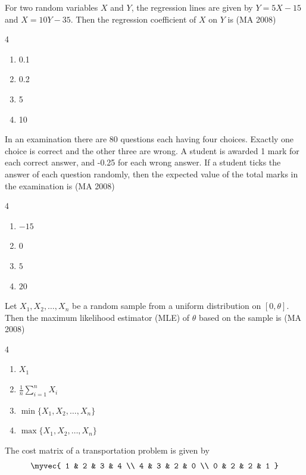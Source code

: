 \item
For two random variables $X$ and $Y$, the regression lines are given by $Y = 5X - 15$ and $X = 10Y - 35$. Then the regression coefficient of $X$ on $Y$ is
\hfill (MA 2008)
\begin{multicols}{4}
\begin{enumerate}
    \item 0.1
    \item 0.2
    \item 5
    \item 10
\end{enumerate}
\end{multicols}

\item
In an examination there are 80 questions each having four choices. Exactly one choice is correct and the other three are wrong. A student is awarded 1 mark for each correct answer, and -0.25 for each wrong answer. If a student ticks the answer of each question randomly, then the expected value of the total marks in the examination is
\hfill (MA 2008)
\begin{multicols}{4}
\begin{enumerate}
    \item $-15$
    \item $0$
    \item $5$
    \item $20$
\end{enumerate}
\end{multicols}

\item
Let $X_1, X_2, \ldots, X_n$ be a random sample from a uniform distribution on $[0,\theta]$. Then the maximum likelihood estimator (MLE) of $\theta$ based on the sample is
\hfill (MA 2008)
\begin{multicols}{4}
\begin{enumerate}
    \item $X_1$
    \item $\frac{1}{n} \sum_{i=1}^n X_i$
    \item $\min\{X_1, X_2, \ldots, X_n\}$
    \item $\max\{X_1, X_2, \ldots, X_n\}$
\end{enumerate}
\end{multicols}

\item
The cost matrix of a transportation problem is given by
\begin{align}
    \myvec{
1 & 2 & 3 & 4 \\
4 & 3 & 2 & 0 \\
0 & 2 & 2 & 1
}
\end{align}


